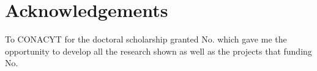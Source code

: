 \chapter{Acknowledgements}%

To CONACYT for the doctoral scholarship granted No. which gave me the opportunity to develop all the research shown as well as the projects that funding No.  

\cleardoublepage